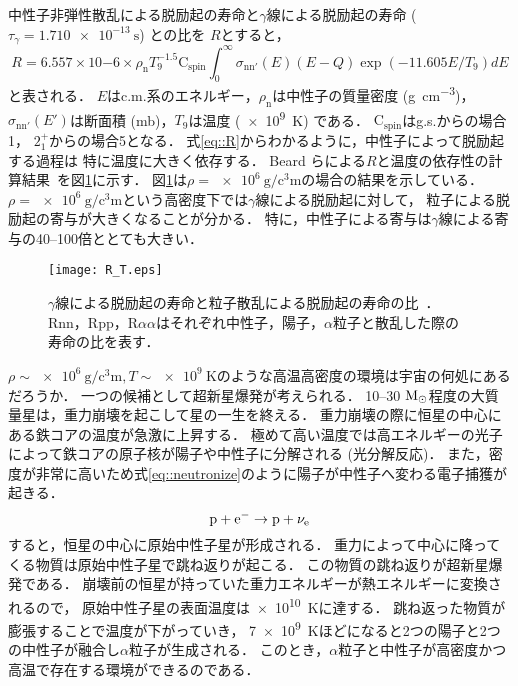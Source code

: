 \documentclass[../master]{subfiles}
\begin{document}
中性子非弾性散乱による脱励起の寿命と$\gamma$線による脱励起の寿命 ($\tau_{\gamma} = \SI{1.710e-13}{\second}$) との比を
$R$とすると，
\begin{equation}
  R = 6.557\times10{-6}\times\rho_{\text{n}}T_{9}^{-1.5}\mathrm{C}_{{\text{spin}}}
  \int^{\infty}_{0}\sigma_{\text{nn}'}(E)(E-Q)\exp(-11.605E/T_{9})dE
  \label{eq::R}
\end{equation}
と表される．
$E$はc.m.系のエネルギー，$\rho_{\text{n}}$は中性子の質量密度 (\si{\gram\per\cubic\centi\metre})，
$\sigma_{\text{nn}'}(E')$は断面積 (\si{\milli\barn})，$T_{9}$は温度 (\SI{e9}{\kelvin}) である．
$\mathrm{C}_{{\text{spin}}}$はg.s.からの場合1，
$2_{1}^{+}$からの場合5となる．
式\eqref{eq::R}からわかるように，中性子によって脱励起する過程は
特に温度に大きく依存する．
Beard らによる$R$と温度の依存性の計算結果~\cite{hotdensemedium}を図\ref{fig::R}に示す．
図\ref{fig::R}は$\rho = \SI{e6}{\gram\per\cubic\centi\metre}$の場合の結果を示している．
$\rho = \SI{e6}{\gram\per\cubic\centi\metre}$という高密度下では$\gamma$線による脱励起に対して，
粒子による脱励起の寄与が大きくなることが分かる．
特に，中性子による寄与は$\gamma$線による寄与の40--100倍ととても大きい．
\begin{figure}
  \centering
  \texttt{[image: R\_T.eps]}
  \caption[$\gamma$線による脱励起の寿命と粒子散乱による脱励起の寿命の比．]
          {$\gamma$線による脱励起の寿命と粒子散乱による脱励起の寿命の比~\cite{hotdensemedium}．
    Rnn，Rpp，R$\alpha\alpha$はそれぞれ中性子，陽子，$\alpha$粒子と散乱した際の寿命の比を表す．}
  \label{fig::R}
\end{figure}

$\rho\sim\SI{e6}{\gram\per\cubic\centi\metre}, T\sim\SI{e9}{\kelvin}$のような高温高密度の環境は宇宙の何処にあるだろうか．
一つの候補として超新星爆発が考えられる．
10--30 $\rm M_{\odot}$程度の大質量星は，重力崩壊を起こして星の一生を終える．
重力崩壊の際に恒星の中心にある鉄コアの温度が急激に上昇する．
極めて高い温度では高エネルギーの光子によって鉄コアの原子核が陽子や中性子に分解される (光分解反応)．
また，密度が非常に高いため式\eqref{eq::neutronize}のように陽子が中性子へ変わる電子捕獲が起きる．
\begin{equation}
  {\rm p}+{\rm e}^{-} \rightarrow {\rm p}+\nu_{\rm e}
  \label{eq::neutronize}
\end{equation}
すると，恒星の中心に原始中性子星が形成される．
重力によって中心に降ってくる物質は原始中性子星で跳ね返りが起こる．
この物質の跳ね返りが超新星爆発である．
崩壊前の恒星が持っていた重力エネルギーが熱エネルギーに変換されるので，
原始中性子星の表面温度は\SI{e10}{\kelvin}に達する．
跳ね返った物質が膨張することで温度が下がっていき，
\SI{7e9}{\kelvin}ほどになると2つの陽子と2つの中性子が融合し$\alpha$粒子が生成される．
このとき，$\alpha$粒子と中性子が高密度かつ高温で存在する環境ができるのである．
\end{document}
